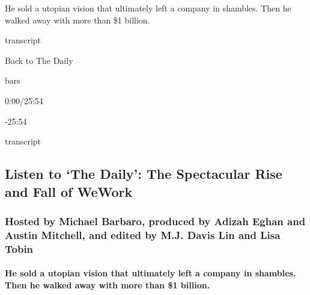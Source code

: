 He sold a utopian vision that ultimately left a company in shambles.
Then he walked away with more than \$1 billion.

transcript

Back to The Daily

bars

0:00/25:54

-25:54

transcript

\hypertarget{listen-to-the-daily-the-spectacular-rise-and-fall-of-wework-1}{%
\subsection{Listen to `The Daily': The Spectacular Rise and Fall of
WeWork}\label{listen-to-the-daily-the-spectacular-rise-and-fall-of-wework-1}}

\hypertarget{hosted-by-michael-barbaro-produced-by-adizah-eghan-and-austin-mitchell-and-edited-by-mj-davis-lin-and-lisa-tobin}{%
\subsubsection{Hosted by Michael Barbaro, produced by Adizah Eghan and
Austin Mitchell, and edited by M.J. Davis Lin and Lisa
Tobin}\label{hosted-by-michael-barbaro-produced-by-adizah-eghan-and-austin-mitchell-and-edited-by-mj-davis-lin-and-lisa-tobin}}

\hypertarget{he-sold-a-utopian-vision-that-ultimately-left-a-company-in-shambles-then-he-walked-away-with-more-than-1-billion}{%
\paragraph{He sold a utopian vision that ultimately left a company in
shambles. Then he walked away with more than \$1
billion.}\label{he-sold-a-utopian-vision-that-ultimately-left-a-company-in-shambles-then-he-walked-away-with-more-than-1-billion}}

